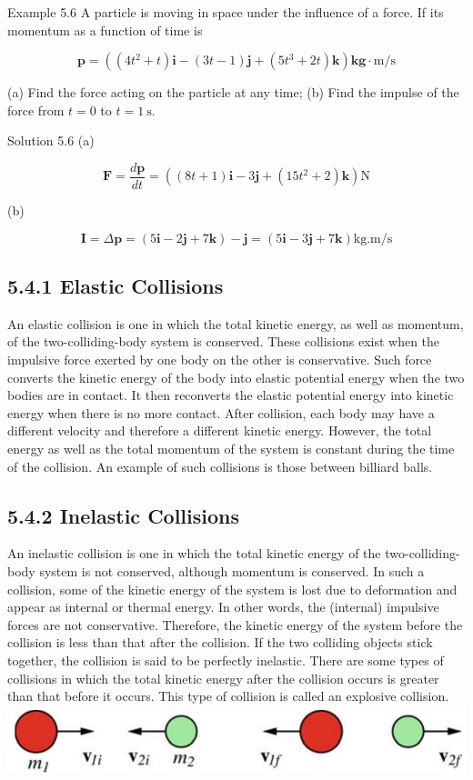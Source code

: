 \documentclass[10pt]{article}
\begin{document}
Example 5.6 A particle is moving in space under the influence of a force. If its momentum as a function of time is

$$
\mathbf{p}=\left(\left(4 t^{2}+t\right) \mathbf{i}-(3 t-1) \mathbf{j}+\left(5 t^{3}+2 t\right) \mathbf{k}\right) \mathbf{k g} \cdot \mathrm{m} / \mathrm{s}
$$

(a) Find the force acting on the particle at any time; (b) Find the impulse of the force from $t=0$ to $t=1 \mathrm{~s}$.

Solution 5.6 (a)

$$
\mathbf{F}=\frac{d \mathbf{p}}{d t}=\left((8 t+1) \mathbf{i}-3 \mathbf{j}+\left(15 t^{2}+2\right) \mathbf{k}\right) \mathrm{N}
$$

(b)

$$
\mathbf{I}=\Delta \mathbf{p}=(5 \mathbf{i}-2 \mathbf{j}+7 \mathbf{k})-\mathbf{j}=(5 \mathbf{i}-3 \mathbf{j}+7 \mathbf{k}) \mathrm{kg} . \mathrm{m} / \mathrm{s}
$$

\subsection*{5.4.1 Elastic Collisions}
An elastic collision is one in which the total kinetic energy, as well as momentum, of the two-colliding-body system is conserved. These collisions exist when the impulsive force exerted by one body on the other is conservative. Such force converts the kinetic energy of the body into elastic potential energy when the two bodies are in contact. It then reconverts the elastic potential energy into kinetic energy when there is no more contact. After collision, each body may have a different velocity and therefore a different kinetic energy. However, the total energy as well as the total momentum of the system is constant during the time of the collision. An example of such collisions is those between billiard balls.

\subsection*{5.4.2 Inelastic Collisions}
An inelastic collision is one in which the total kinetic energy of the two-colliding-body system is not conserved, although momentum is conserved. In such a collision, some of the kinetic energy of the system is lost due to deformation and appear as internal or thermal energy. In other words, the (internal) impulsive forces are not conservative. Therefore, the kinetic energy of the system before the collision is less than that after the collision. If the two colliding objects stick together, the collision is said to be perfectly inelastic. There are some types of collisions in which the total kinetic energy after the collision occurs is greater than that before it occurs. This type of collision is called an explosive collision.\\
\includegraphics[max width=\textwidth, center]{2024_09_13_db1f357d2aad0a03eb2eg-086(1)}
\end{document}
